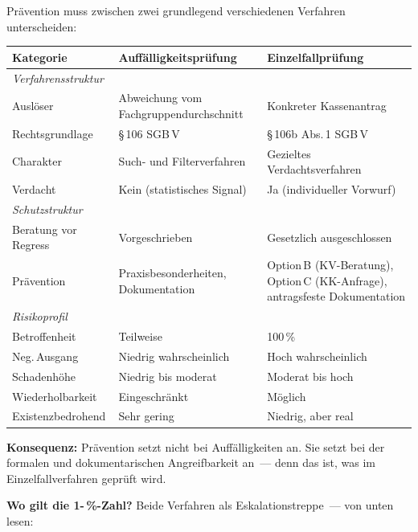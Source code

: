 \documentclass[a4paper]{umbruch-position}
\begin{document}
Pr\"avention muss zwischen zwei grundlegend verschiedenen Verfahren unterscheiden:

{\small
\begin{tabularx}{\textwidth}{p{3cm} X X}
\toprule
\textbf{Kategorie} & \textbf{Auff\"alligkeitspr\"ufung} & \textbf{Einzelfallpr\"ufung} \\
\midrule
\multicolumn{3}{l}{\textit{Verfahrensstruktur}} \\
\addlinespace[2pt]
Ausl\"oser & Abweichung vom Fachgruppen\-durch\-schnitt & Konkreter Kassenantrag \\
\addlinespace
Rechts\-grundlage & \S\,106 SGB\,V & \S\,106b Abs.\,1 SGB\,V \\
\addlinespace
Charakter & Such- und Filterverfahren & Gezieltes Verdachts\-verfahren \\
\addlinespace
Verdacht & Kein (statistisches Signal) & Ja (individueller Vorwurf) \\
\midrule
\multicolumn{3}{l}{\textit{Schutzstruktur}} \\
\addlinespace[2pt]
Beratung vor Regress & Vorgeschrieben & Gesetzlich ausgeschlossen \\
\addlinespace
Pr\"avention & Praxis\-besonderheiten, Dokumentation & Option\,B (KV-Beratung), Option\,C (KK-Anfrage), antragsfeste Doku\-mentation \\
\midrule
\multicolumn{3}{l}{\textit{Risikoprofil}} \\
\addlinespace[2pt]
Betroffenheit & Teilweise & 100\,\% \\
\addlinespace
Neg.\,Ausgang & Niedrig wahrscheinlich & Hoch wahrscheinlich \\
\addlinespace
Schaden\-h\"ohe & Niedrig bis moderat & Moderat bis hoch \\
\addlinespace
Wiederholbarkeit & Eingeschr\"ankt & M\"oglich \\
\addlinespace
Existenz\-bedrohend & Sehr gering & Niedrig, aber real \\
\bottomrule
\end{tabularx}
}

\textbf{Konsequenz:} Pr\"avention setzt nicht bei Auff\"alligkeiten an. Sie setzt bei der formalen und dokumentarischen Angreifbarkeit an~--- denn das ist, was im Einzelfallverfahren gepr\"uft wird.

\medskip
\textbf{Wo gilt die 1-\,\%-Zahl?} Beide Verfahren als Eskalationstreppe~--- von unten lesen:
\end{document}
